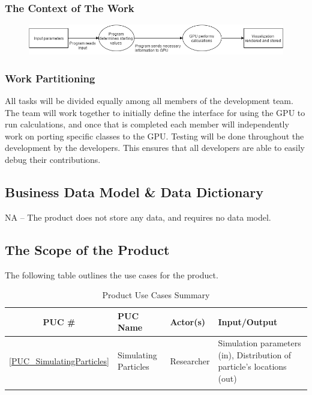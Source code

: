 \documentclass[12pt]{article}
\begin{document}
\subsubsection{The Context of The Work}
\begin{figure}[h]
\includegraphics[width=\textwidth]{WorkContextDiagram} 
\end{figure} 

\subsubsection{Work Partitioning}
All tasks will be divided equally among all members of the development team. The team will work together to initially define the interface for using the GPU to run calculations, and once that is completed each member will independently work on porting specific classes to the GPU. Testing will be done throughout the development by the developers. This ensures that all developers are able to easily debug their contributions.

\subsection{Business Data Model \& Data Dictionary} %
NA -- The product does not store any data, and requires no data model.

\subsection{The Scope of the Product}
The following table outlines the use cases for the product.

\begin{table}[h]
\centering
\caption{Product Use Cases Summary}
\begin{tabularx}{\textwidth}{c|l|l|X}
\Xhline{2\arrayrulewidth}
\bf PUC \# & \bf PUC Name & Actor(s) & \bf Input/Output\\
\hline
\ref{PUC_SimulatingParticles} & Simulating Particles & Researcher & Simulation parameters (in), Distribution of particle's locations (out)\\
\Xhline{2\arrayrulewidth}
\end{tabularx}
\end{table}
\end{document}
